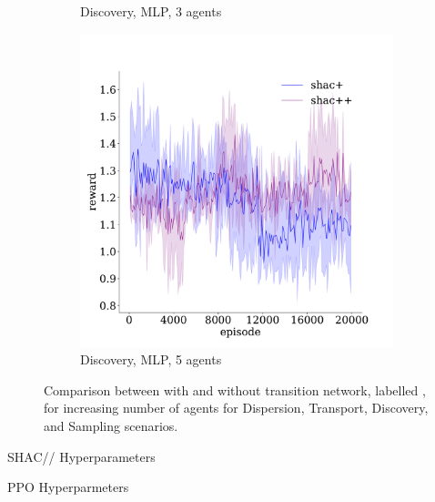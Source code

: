 \begin{figure}[!t]
\begin{subfigure}[b]{0.32\textwidth}
        \caption{Discovery, MLP, 3 agents}
        \label{fig:discovery-ablation-mlp-3}
    \end{subfigure}
    \begin{subfigure}[b]{0.32\textwidth}
        \includegraphics[width=\textwidth]{figs/discovery-ablation-5-mlp.pdf}
        \caption{Discovery, MLP, 5 agents}
        \label{fig:discovery-ablation-mlp-5}
    \end{subfigure}

    \caption{Comparison between \fname{} with and without transition network, labelled \fnamer{}, for increasing number of agents for Dispersion, Transport, Discovery, and Sampling scenarios.}
    \label{fig:ablation}
\end{figure}

\begin{table}[t]
        \centering
        
        \caption{SHAC/\fname{}/\fnamer{} Hyperparameters}
        \label{apx:tab:shac}
\end{table}

\begin{table}[t]
        \centering
        
        \caption{PPO Hyperparmeters}
        \label{apx:tab:ppo}
\end{table}

